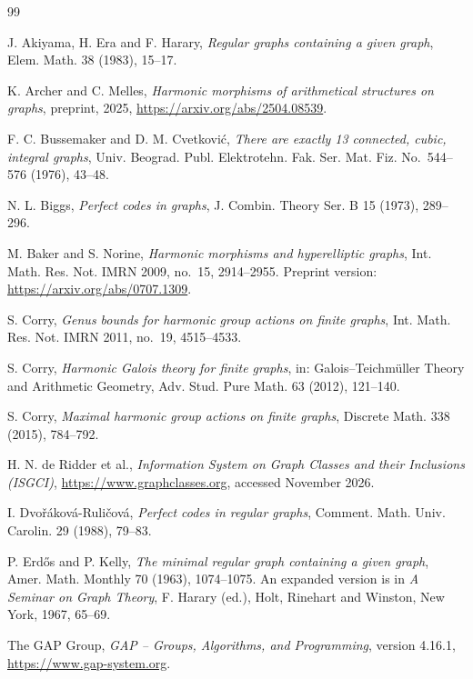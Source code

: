 \documentclass[12pt,letterpaper]{article}
\theoremstyle{definition}
\begin{document}
\begin{thebibliography}{99}
\raggedright

J. Akiyama, H. Era and F. Harary,
{\it Regular graphs containing a given graph},
Elem. Math. 38 (1983), 15--17.

K. Archer and C. Melles,
{\it Harmonic morphisms of arithmetical structures on graphs},
preprint, 2025, \url{https://arxiv.org/abs/2504.08539}.

F. C. Bussemaker and D. M. Cvetkovi\'c,
{\it There are exactly 13 connected, cubic, integral graphs},
Univ. Beograd. Publ. Elektrotehn. Fak. Ser. Mat. Fiz. No.~544--576 (1976),
43--48.

N. L. Biggs,
{\it Perfect codes in graphs},
J. Combin. Theory Ser. B 15 (1973), 289--296.

M. Baker and S. Norine,
{\it Harmonic morphisms and hyperelliptic graphs},
Int. Math. Res. Not. IMRN 2009, no.~15, 2914--2955.
Preprint version: \url{https://arxiv.org/abs/0707.1309}.

S. Corry,
{\it Genus bounds for harmonic group actions on finite graphs},
Int. Math. Res. Not. IMRN 2011, no.~19, 4515--4533.

S. Corry,
{\it Harmonic Galois theory for finite graphs},
in: Galois--Teichm\"uller Theory and Arithmetic Geometry,
Adv. Stud. Pure Math. 63 (2012), 121--140.

S. Corry,
{\it Maximal harmonic group actions on finite graphs},
Discrete Math. 338 (2015), 784--792.

H. N. de Ridder et al.,
{\it Information System on Graph Classes and their Inclusions (ISGCI)},
\url{https://www.graphclasses.org}, accessed November 2026.

I. Dvo\v{r}\'akov\'a-Ruli\v{c}ov\'a,
{\it Perfect codes in regular graphs},
Comment. Math. Univ. Carolin. 29 (1988), 79--83.

P. Erd\H{o}s and P. Kelly,
{\it The minimal regular graph containing a given graph},
Amer. Math. Monthly 70 (1963), 1074--1075.
An expanded version is in {\it A Seminar on Graph Theory}, F. Harary (ed.),
Holt, Rinehart and Winston, New York, 1967, 65--69.

The GAP Group,
{\it GAP -- Groups, Algorithms, and Programming}, version 4.16.1,
\url{https://www.gap-system.org}.


\end{thebibliography}
\end{document}
